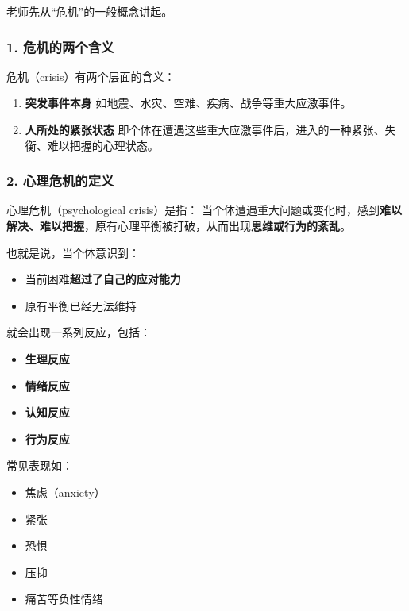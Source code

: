 \documentclass[
  chinese,
  9pt,
  a4paper,
]{ctexart}
\providecommand{\tightlist}{%
  \setlength{\itemsep}{0pt}\setlength{\parskip}{0pt}}
\begin{document}
老师先从``危机''的一般概念讲起。

\subsubsection{1.
危机的两个含义}\label{ux5371ux673aux7684ux4e24ux4e2aux542bux4e49}

危机（crisis）有两个层面的含义：

\begin{enumerate}
\def\labelenumi{\arabic{enumi}.}
\tightlist
\item
  \textbf{突发事件本身} 如地震、水灾、空难、疾病、战争等重大应激事件。
\item
  \textbf{人所处的紧张状态}
  即个体在遭遇这些重大应激事件后，进入的一种紧张、失衡、难以把握的心理状态。
\end{enumerate}

\subsubsection{2.
心理危机的定义}\label{ux5fc3ux7406ux5371ux673aux7684ux5b9aux4e49}

心理危机（psychological crisis）是指：
当个体遭遇重大问题或变化时，感到\textbf{难以解决、难以把握}，原有心理平衡被打破，从而出现\textbf{思维或行为的紊乱}。

也就是说，当个体意识到：

\begin{itemize}
\tightlist
\item
  当前困难\textbf{超过了自己的应对能力}
\item
  原有平衡已经无法维持
\end{itemize}

就会出现一系列反应，包括：

\begin{itemize}
\tightlist
\item
  \textbf{生理反应}
\item
  \textbf{情绪反应}
\item
  \textbf{认知反应}
\item
  \textbf{行为反应}
\end{itemize}

常见表现如：

\begin{itemize}
\tightlist
\item
  焦虑（anxiety）
\item
  紧张
\item
  恐惧
\item
  压抑
\item
  痛苦等负性情绪
\end{itemize}
\end{document}
